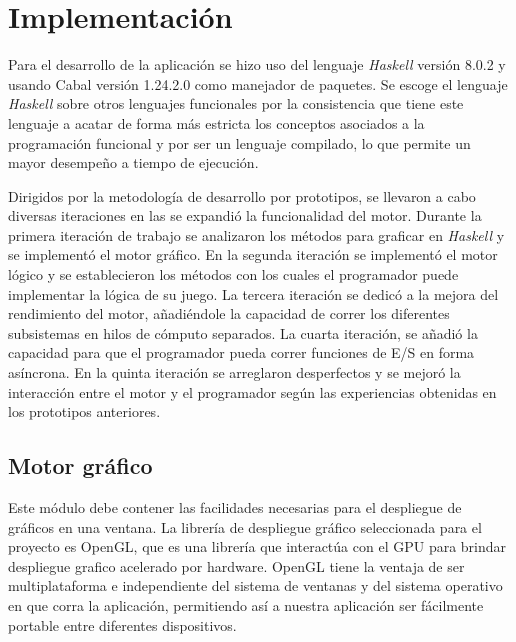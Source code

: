 
\setcounter{secnumdepth}{4}

\chapter{Implementación}  %
\label{capitulo4}

\graphicspath{{implementacion/Figs/Vector/}{implementacion/Figs/}}

Para el desarrollo de la aplicación se hizo uso del lenguaje \emph{Haskell} versión 8.0.2 y usando Cabal versión 1.24.2.0 como manejador de paquetes. Se escoge el lenguaje \emph{Haskell} sobre otros lenguajes funcionales por la consistencia que tiene este lenguaje a acatar de forma más estricta los conceptos asociados a la programación funcional y por ser un lenguaje compilado, lo que permite un mayor desempeño a tiempo de ejecución.

Dirigidos por la metodología de desarrollo por prototipos, se llevaron a cabo diversas iteraciones en las se expandió la funcionalidad del motor. Durante la primera iteración de trabajo se analizaron los métodos para graficar en \emph{Haskell} y se implementó el motor gráfico. En la segunda iteración se implementó el motor lógico y se establecieron los métodos con los cuales el programador puede implementar la lógica de su juego.  La tercera iteración se dedicó a la mejora del rendimiento del motor, añadiéndole la capacidad de correr los diferentes subsistemas en hilos de cómputo separados. La cuarta iteración, se añadió la capacidad para que el programador pueda correr funciones de E/S en forma asíncrona. En la quinta iteración se arreglaron desperfectos y se mejoró la interacción entre el motor y el programador según las experiencias obtenidas en los prototipos anteriores.

\section{Motor gráfico}

Este módulo debe contener las facilidades necesarias para el despliegue de gráficos en una ventana. La librería de despliegue gráfico seleccionada para el proyecto es OpenGL, que es una librería que interactúa con el GPU para brindar despliegue grafico acelerado por hardware. OpenGL tiene la ventaja de ser multiplataforma e independiente del sistema de ventanas y del sistema operativo en que corra la aplicación, permitiendo así a nuestra aplicación ser fácilmente portable entre diferentes dispositivos.

